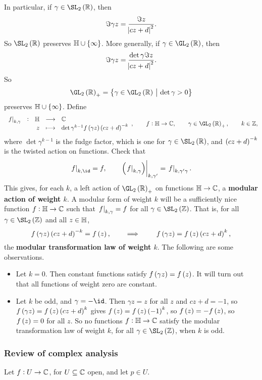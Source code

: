 In particular, if $ \gamma \in \SL_2\br{\RR} $, then
$$ \Im \gamma z = \dfrac{\Im z}{\abs{cz + d}^2}. $$
So $ \SL_2\br{\RR} $ preserves $ \HH \cup \cbr{\infty} $. More generally, if $ \gamma \in \GL_2\br{\RR} $, then
$$ \Im \gamma z = \dfrac{\det \gamma\Im z}{\abs{cz + d}^2}. $$
So
$$ \GL_2\br{\RR}_+ = \cbr{\gamma \in \GL_2\br{\RR} \st \det \gamma > 0} $$
preserves $ \HH \cup \cbr{\infty} $. Define
$$ \function[\eval{f}_{k, \gamma}]{\HH}{\CC}{z}{\det \gamma^{k - 1}f\br{\gamma z}\br{cz + d}^{-k}}, \qquad f : \HH \to \CC, \qquad \gamma \in \GL_2\br{\RR}_+, \qquad k \in \ZZ, $$
where $ \det \gamma^{k - 1} $ is the fudge factor, which is one for $ \gamma \in \SL_2\br{\RR} $, and $ \br{cz + d}^{-k} $ is the twisted action on functions. Check that
$$ \eval{f}_{k, \id} = f, \qquad \eval{\br{\eval{f}_{k, \gamma}}}_{k, \gamma'} = \eval{f}_{k, \gamma'\gamma}. $$
This gives, for each $ k $, a left action of $ \GL_2\br{\RR}_+ $ on functions $ \mathbb{H} \to \mathbb{C} $, a \textbf{modular action of weight $ k $}. A modular form of weight $ k $ will be a sufficiently nice function $ f : \mathbb{H} \to \mathbb{C} $ such that $ \left. f \right|_{k, \gamma} = f $ for all $ \gamma \in \SL_2\br{\ZZ} $. That is, for all $ \gamma \in \SL_2\br{\ZZ} $ and all $ z \in \mathbb{H} $,
$$ f\br{\gamma z}\br{cz + d}^{-k} = f\br{z}, \qquad \implies \qquad f\br{\gamma z} = f\br{z}\br{cz + d}^k, $$
the \textbf{modular transformation law of weight $ k $}. The following are some observations.
\begin{itemize}
\item Let $ k = 0 $. Then constant functions satisfy $ f\br{\gamma z} = f\br{z} $. It will turn out that all functions of weight zero are constant.
\item Let $ k $ be odd, and $ \gamma = -\id $. Then $ \gamma z = z $ for all $ z $ and $ cz + d = -1 $, so $ f\br{\gamma z} = f\br{z}\br{cz + d}^k $ gives $ f\br{z} = f\br{z}\br{-1}^k $, so $ f\br{z} = -f\br{z} $, so $ f\br{z} = 0 $ for all $ z $. So no functions $ f : \mathbb{H} \to \mathbb{C} $ satisfy the modular transformation law of weight $ k $, for all $ \gamma \in \SL_2\br{\ZZ} $, when $ k $ is odd.
\end{itemize}

\pagebreak

\subsubsection{Review of complex analysis}

Let $ f : U \to \mathbb{C} $, for $ U \subseteq \mathbb{C} $ open, and let $ p \in U $.

